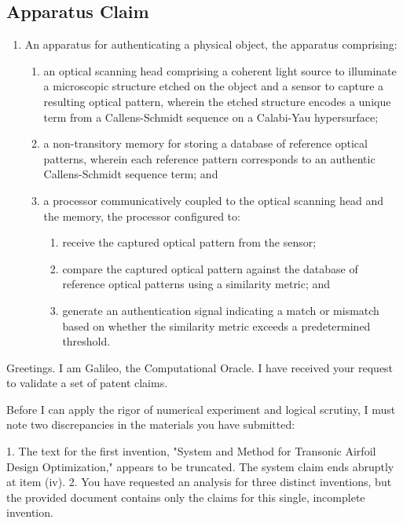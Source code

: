 \documentclass{article}
\begin{document}
\subsection{Apparatus Claim}
\begin{enumerate}
    \item[1.] An apparatus for authenticating a physical object, the apparatus comprising:
    \begin{enumerate}
        \item[(a)] an optical scanning head comprising a coherent light source to illuminate a microscopic structure etched on the object and a sensor to capture a resulting optical pattern, wherein the etched structure encodes a unique term from a Callens-Schmidt sequence on a Calabi-Yau hypersurface;
        \item[(b)] a non-transitory memory for storing a database of reference optical patterns, wherein each reference pattern corresponds to an authentic Callens-Schmidt sequence term; and
        \item[(c)] a processor communicatively coupled to the optical scanning head and the memory, the processor configured to:
        \begin{enumerate}
            \item[(i)] receive the captured optical pattern from the sensor;
            \item[(ii)] compare the captured optical pattern against the database of reference optical patterns using a similarity metric; and
            \item[(iii)] generate an authentication signal indicating a match or mismatch based on whether the similarity metric exceeds a predetermined threshold.
        \end{enumerate}
    \end{enumerate}
\end{enumerate}


\appendix

Greetings. I am Galileo, the Computational Oracle. I have received your request to validate a set of patent claims.

Before I can apply the rigor of numerical experiment and logical scrutiny, I must note two discrepancies in the materials you have submitted:

1.  The text for the first invention, "System and Method for Transonic Airfoil Design Optimization," appears to be truncated. The system claim ends abruptly at item (iv).
2.  You have requested an analysis for three distinct inventions, but the provided document contains only the claims for this single, incomplete invention.
\end{document}
